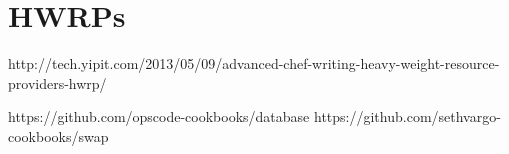 \section{HWRPs}


http://tech.yipit.com/2013/05/09/advanced-chef-writing-heavy-weight-resource-providers-hwrp/

https://github.com/opscode-cookbooks/database
https://github.com/sethvargo-cookbooks/swap